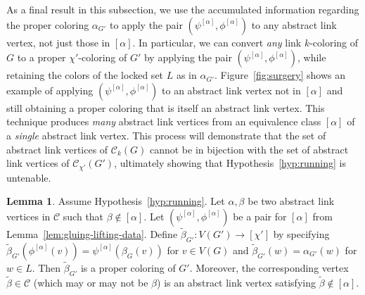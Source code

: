 \documentclass{amsart}
\theoremstyle{hypothesisstyle}
\theoremstyle{definition}
\newtheorem{lemma}[theorem]{Lemma}
\theoremstyle{remark}
\numberwithin{equation}{section}
\newcommand{\C}{\mathcal C}
\begin{document}
As a final result in this subsection, we use the accumulated information regarding the proper coloring $\alpha_{G'}$ to apply the pair $(\psi^{[\alpha]},\phi^{[\alpha]})$ to any abstract link vertex, not just those in $[\alpha]$.  In particular, we can convert {\it any} link $k$-coloring of $G$ to a proper $\chi'$-coloring of $G'$ by applying the pair $(\psi^{[\alpha]},\phi^{[\alpha]})$, while retaining the colors of the locked set $L$ as in $\alpha_{G'}$.  Figure~\ref{fig:surgery} shows an example of applying $(\psi^{[\alpha]},\phi^{[\alpha]})$ to an abstract link vertex not in $[\alpha]$ and still obtaining a proper coloring that is itself an abstract link vertex.  This technique produces \emph{many} abstract link vertices from an equivalence class $[\alpha]$ of a \emph{single} abstract link vertex. This process will demonstrate that the set of abstract link vertices of $\mathcal{C}_k(G)$ cannot be in bijection with the set of abstract link vertices of $\mathcal{C}_{\chi'}(G')$, ultimately showing that Hypothesis~\ref{hyp:running} is untenable.



\begin{lemma}
\label{lem:all_extend}
Assume Hypothesis~\ref{hyp:running}. Let $\alpha,\beta$ be two abstract link vertices in $\mathcal{C}$ such that $\beta\notin[\alpha]$. Let $(\psi^{[\alpha]},\phi^{[\alpha]})$ be a pair for $[\alpha]$ from Lemma~\ref{lem:gluing-lifting-data}. Define $\widetilde{\beta}_{G'}\colon V(G')\to [\chi']$ by specifying $\widetilde{\beta}_{G'}(\phi^{[\alpha]}(v))=\psi^{[\alpha]}(\beta_G(v))$ for $v\in V(G)$ and $\widetilde{\beta}_{G'}(w)=\alpha_{G'}(w)$ for $w\in L$. Then $\widetilde{\beta}_{G'}$ is a proper coloring of $G'$.  Moreover, the corresponding vertex $\widetilde{\beta}\in\C$ (which may or may not be $\beta$) is an abstract link vertex satisfying  $\widetilde{\beta}\notin[\alpha]$.
\end{lemma}
\end{document}
